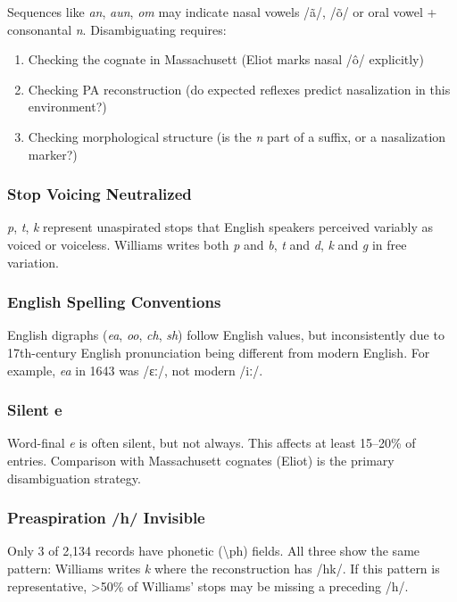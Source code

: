 Sequences like \textit{an}, \textit{aun}, \textit{om} may indicate nasal
vowels /ã/, /õ/ or oral vowel + consonantal \textit{n}. Disambiguating
requires:
\begin{enumerate}
  \item Checking the cognate in Massachusett (Eliot marks nasal /ô/ explicitly)
  \item Checking PA reconstruction (do expected reflexes predict nasalization
    in this environment?)
  \item Checking morphological structure (is the \textit{n} part of a suffix,
    or a nasalization marker?)
\end{enumerate}

\subsubsection{Stop Voicing Neutralized}

\textit{p}, \textit{t}, \textit{k} represent unaspirated stops that English
speakers perceived variably as voiced or voiceless. Williams writes both
\textit{p} and \textit{b}, \textit{t} and \textit{d}, \textit{k} and
\textit{g} in free variation.

\subsubsection{English Spelling Conventions}

English digraphs (\textit{ea}, \textit{oo}, \textit{ch}, \textit{sh}) follow
English values, but inconsistently due to 17th-century English pronunciation
being different from modern English. For example, \textit{ea} in 1643 was
/ɛː/, not modern /iː/.

\subsubsection{Silent e}

Word-final \textit{e} is often silent, but not always. This affects at least
15--20\% of entries. Comparison with Massachusett cognates (Eliot) is the
primary disambiguation strategy.

\subsubsection{Preaspiration /h/ Invisible}

Only 3 of 2,134 records have phonetic (\textbackslash ph) fields. All three
show the same pattern: Williams writes \textit{k} where the reconstruction has
/hk/. If this pattern is representative, >50\% of Williams' stops may be
missing a preceding /h/.

